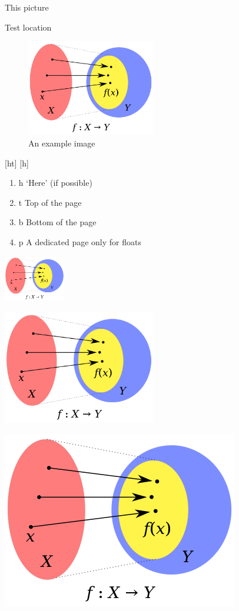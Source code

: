 \documentclass{article}
\begin{document}
This picture
\lipsum[1]

Test location
\begin{figure}[hb] %
    \centering
    \includegraphics[width=0.5\textwidth]{test.png}
    \caption{An example image}
\end{figure}

[ht] [h]
\begin{enumerate}
    \item h ‘Here’ (if possible)
    \item t Top of the page
    \item b Bottom of the page
    \item p A dedicated page only for floats
\end{enumerate}
\begin{center}
  \includegraphics[height=2cm]{test.png}
\end{center}
\begin{center}
    \includegraphics[width = 0.5\textwidth]{test.png}
\end{center}
\begin{center}
    \includegraphics[height = 0.5\textwidth]{test.png}
\end{center}
\end{document}
